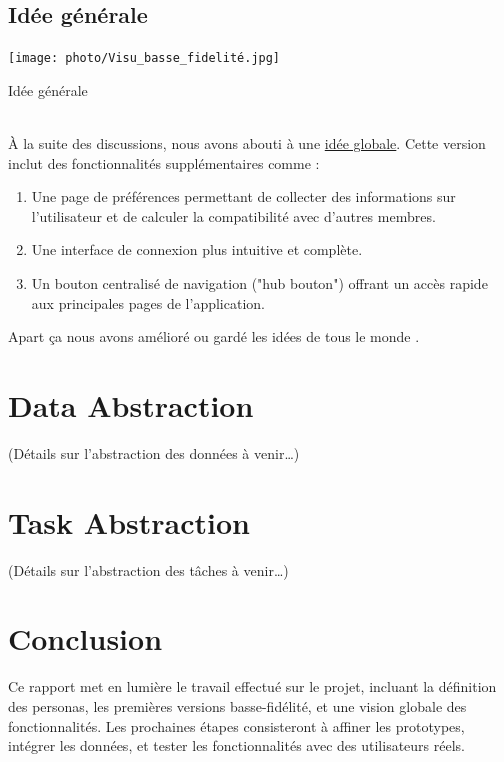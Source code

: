 \documentclass{article}
\begin{document}
\subsection{Idée générale}
\texttt{[image: photo/Visu\_basse\_fidelité.jpg]}\caption{Idée générale}
\label{fig:général}
\vspace{1cm}\\
À la suite des discussions, nous avons abouti à une \hyperref[fig:général]{idée globale}. 
Cette version inclut des fonctionnalités supplémentaires comme :
\begin{enumerate}
    \item Une page de préférences permettant de collecter des informations sur l’utilisateur et de calculer la compatibilité avec d’autres membres.

    \item Une interface de connexion plus intuitive et complète.

    \item Un bouton centralisé de navigation ("hub bouton") offrant un accès rapide aux principales 
    pages de l’application.
\end{enumerate}
Apart ça nous avons amélioré ou gardé les idées de tous le monde . 

\newpage
\section{Data Abstraction}
\label{sec:data}
(Détails sur l'abstraction des données à venir…)

\section{Task Abstraction}
(Détails sur l'abstraction des tâches à venir…)

\section{Conclusion}
Ce rapport met en lumière le travail effectué sur le projet, incluant la définition des personas, 
les premières versions basse-fidélité, et une vision globale des fonctionnalités. 
Les prochaines étapes consisteront à affiner les prototypes, intégrer les données, et tester 
les fonctionnalités avec des utilisateurs réels. 
\end{document}
